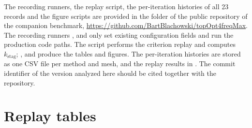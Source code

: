 \documentclass[11pt,a4paper]{article}
\newcommand{\kstag}{k_{\mathrm{stag}}}
\begin{document}
The recording runners, the replay script, the per-iteration histories of all 23 records and the figure scripts are provided in the folder  of the public repository of the companion benchmark, \url{https://github.com/BartBlachowski/topOpt4freqMax}. The recording runners ,  and  only set existing configuration fields and run the production code paths. The script  performs the criterion replay and computes $\kstag$; ,  and  produce the tables and figures. The per-iteration histories are stored as one CSV file per method and mesh, and the replay results in . The commit identifier of the version analyzed here should be cited together with the repository.

\appendix
\setcounter{table}{0}
\renewcommand{\thetable}{A\arabic{table}}
\section{Replay tables}
\label{app:tables}
\end{document}
